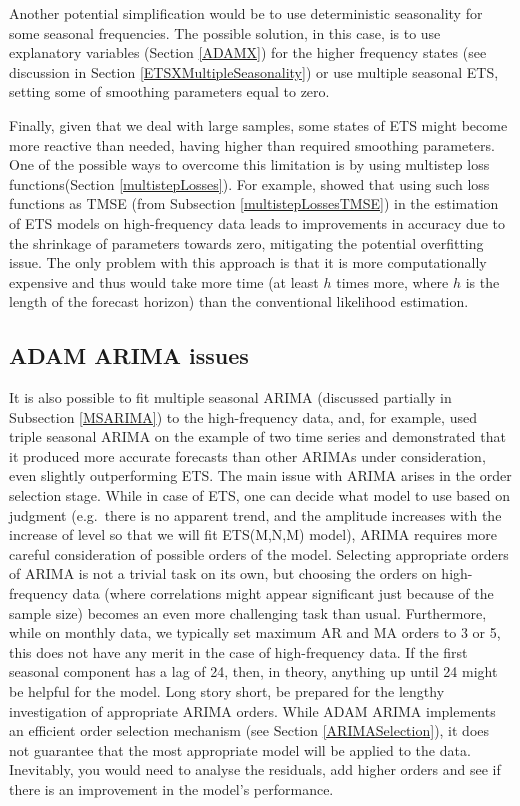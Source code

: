 \documentclass[
]{book}
\theoremstyle{definition}
\theoremstyle{definition}
\theoremstyle{definition}
\theoremstyle{definition}
\theoremstyle{remark}
\begin{document}
Another potential simplification would be to use deterministic seasonality for some seasonal frequencies. The possible solution, in this case, is to use explanatory variables (Section \ref{ADAMX}) for the higher frequency states (see discussion in Section \ref{ETSXMultipleSeasonality}) or use multiple seasonal ETS, setting some of smoothing parameters equal to zero.

Finally, given that we deal with large samples, some states of ETS might become more reactive than needed, having higher than required smoothing parameters. One of the possible ways to overcome this limitation is by using multistep loss functions(Section \ref{multistepLosses}). For example, \citet{kourentzes2018smoothing} showed that using such loss functions as TMSE (from Subsection \ref{multistepLossesTMSE}) in the estimation of ETS models on high-frequency data leads to improvements in accuracy due to the shrinkage of parameters towards zero, mitigating the potential overfitting issue. The only problem with this approach is that it is more computationally expensive and thus would take more time (at least \(h\) times more, where \(h\) is the length of the forecast horizon) than the conventional likelihood estimation.

\hypertarget{adam-arima-issues}{%
\subsection{ADAM ARIMA issues}\label{adam-arima-issues}}

It is also possible to fit multiple seasonal ARIMA (discussed partially in Subsection \ref{MSARIMA}) to the high-frequency data, and, for example, \citet{Taylor2010} used triple seasonal ARIMA on the example of two time series and demonstrated that it produced more accurate forecasts than other ARIMAs under consideration, even slightly outperforming ETS. The main issue with ARIMA arises in the order selection stage. While in case of ETS, one can decide what model to use based on judgment (e.g.~there is no apparent trend, and the amplitude increases with the increase of level so that we will fit ETS(M,N,M) model), ARIMA requires more careful consideration of possible orders of the model. Selecting appropriate orders of ARIMA is not a trivial task on its own, but choosing the orders on high-frequency data (where correlations might appear significant just because of the sample size) becomes an even more challenging task than usual. Furthermore, while on monthly data, we typically set maximum AR and MA orders to 3 or 5, this does not have any merit in the case of high-frequency data. If the first seasonal component has a lag of 24, then, in theory, anything up until 24 might be helpful for the model. Long story short, be prepared for the lengthy investigation of appropriate ARIMA orders. While ADAM ARIMA implements an efficient order selection mechanism (see Section \ref{ARIMASelection}), it does not guarantee that the most appropriate model will be applied to the data. Inevitably, you would need to analyse the residuals, add higher orders and see if there is an improvement in the model's performance.
\end{document}
